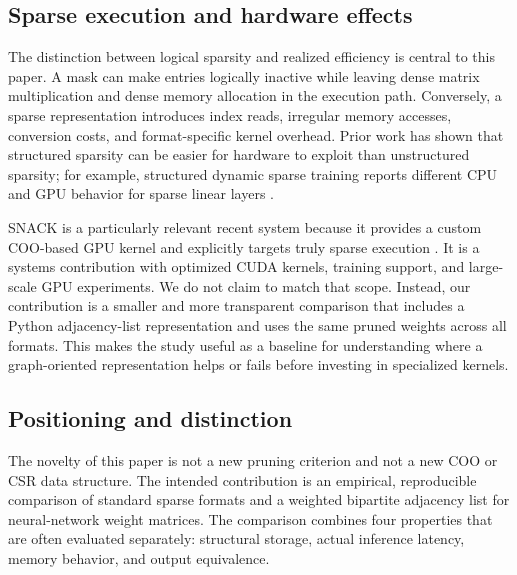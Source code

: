 \documentclass[11pt]{article}
\begin{document}
\subsection{Sparse execution and hardware effects}

The distinction between logical sparsity and realized efficiency is central to
this paper.  A mask can make entries logically inactive while leaving dense
matrix multiplication and dense memory allocation in the execution path.
Conversely, a sparse representation introduces index reads, irregular memory
accesses, conversion costs, and format-specific kernel overhead.  Prior work
has shown that structured sparsity can be easier for hardware to exploit than
unstructured sparsity; for example, structured dynamic sparse training reports
different CPU and GPU behavior for sparse linear layers \cite{srigl}.

SNACK is a particularly relevant recent system because it provides a custom
COO-based GPU kernel and explicitly targets truly sparse execution
\cite{snack2026}.  It is a systems contribution with optimized CUDA kernels,
training support, and large-scale GPU experiments.  We do not claim to match
that scope.  Instead, our contribution is a smaller and more transparent
comparison that includes a Python adjacency-list representation and uses the
same pruned weights across all formats.  This makes the study useful as a
baseline for understanding where a graph-oriented representation helps or
fails before investing in specialized kernels.

\subsection{Positioning and distinction}

The novelty of this paper is not a new pruning criterion and not a new COO or
CSR data structure.  The intended contribution is an empirical, reproducible
comparison of standard sparse formats and a weighted bipartite adjacency list
for neural-network weight matrices.  The comparison combines four properties
that are often evaluated separately: structural storage, actual inference
latency, memory behavior, and output equivalence.
\end{document}
